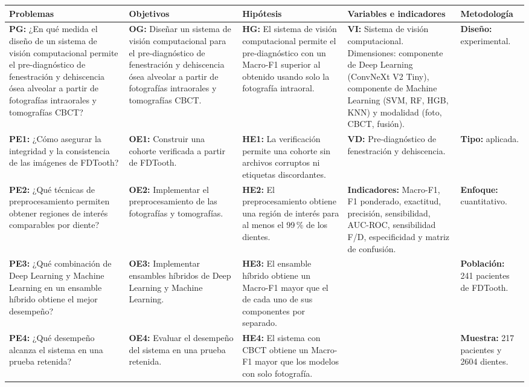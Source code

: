 \documentclass[12pt,a4paper]{article}
\begin{document}
\begin{center}
\singlespacing\scriptsize
\begin{tabularx}{\textwidth}{|*{5}{>{\raggedright\arraybackslash}X|}}
\hline
\textbf{Problemas} & \textbf{Objetivos} & \textbf{Hipótesis} &
\textbf{Variables e indicadores} & \textbf{Metodología} \\ \hline
\textbf{PG:} ¿En qué medida el diseño de un sistema de visión
computacional permite el pre-diagnóstico de fenestración y dehiscencia
ósea alveolar a partir de fotografías intraorales y tomografías CBCT?
&
\textbf{OG:} Diseñar un sistema de visión computacional para el
pre-diagnóstico de fenestración y dehiscencia ósea alveolar a partir de
fotografías intraorales y tomografías CBCT.
&
\textbf{HG:} El sistema de visión computacional permite el
pre-diagnóstico con un Macro-F1 superior al obtenido usando solo la
fotografía intraoral.
&
\textbf{VI:} Sistema de visión computacional. Dimensiones: componente de
Deep Learning (ConvNeXt V2 Tiny), componente de Machine Learning (SVM,
RF, HGB, KNN) y modalidad (foto, CBCT, fusión).
&
\textbf{Diseño:} experimental. \\ \hline
\textbf{PE1:} ¿Cómo asegurar la integridad y la consistencia de las
imágenes de FDTooth?
&
\textbf{OE1:} Construir una cohorte verificada a partir de FDTooth.
&
\textbf{HE1:} La verificación permite una cohorte sin archivos corruptos
ni etiquetas discordantes.
&
\textbf{VD:} Pre-diagnóstico de fenestración y dehiscencia.
&
\textbf{Tipo:} aplicada. \\ \hline
\textbf{PE2:} ¿Qué técnicas de preprocesamiento permiten obtener regiones
de interés comparables por diente?
&
\textbf{OE2:} Implementar el preprocesamiento de las fotografías y
tomografías.
&
\textbf{HE2:} El preprocesamiento obtiene una región de interés para al
menos el 99\,\% de los dientes.
&
\textbf{Indicadores:} Macro-F1, F1 ponderado, exactitud, precisión,
sensibilidad, AUC-ROC, sensibilidad F/D, especificidad y matriz de
confusión.
&
\textbf{Enfoque:} cuantitativo. \\ \hline
\textbf{PE3:} ¿Qué combinación de Deep Learning y Machine Learning en un
ensamble híbrido obtiene el mejor desempeño?
&
\textbf{OE3:} Implementar ensambles híbridos de Deep Learning y Machine
Learning.
&
\textbf{HE3:} El ensamble híbrido obtiene un Macro-F1 mayor que el de
cada uno de sus componentes por separado.
&
&
\textbf{Población:} 241 pacientes de FDTooth. \\ \hline
\textbf{PE4:} ¿Qué desempeño alcanza el sistema en una prueba retenida?
&
\textbf{OE4:} Evaluar el desempeño del sistema en una prueba retenida.
&
\textbf{HE4:} El sistema con CBCT obtiene un Macro-F1 mayor que los
modelos con solo fotografía.
&
&
\textbf{Muestra:} 217 pacientes y 2604 dientes. \\ \hline
\end{tabularx}
\end{center}
\end{document}
